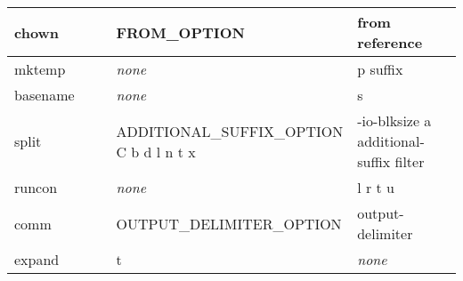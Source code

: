\begin{longtable}{|p{0.3\linewidth}|p{0.4\linewidth}|p{0.3\linewidth}|}
\hline
chown & FROM\_OPTION & from reference\\ 
\hline
mktemp &  \textit{none} &p suffix\\ 
\hline
basename &  \textit{none} &s\\ 
\hline
split & ADDITIONAL\_SUFFIX\_OPTION C b d l n t x & -io-blksize a additional-suffix filter\\ 
\hline
runcon &  \textit{none} &l r t u\\ 
\hline
comm & OUTPUT\_DELIMITER\_OPTION & output-delimiter\\ 
\hline
expand & t &  \textit{none}\\ 
\hline
\end{longtable}

